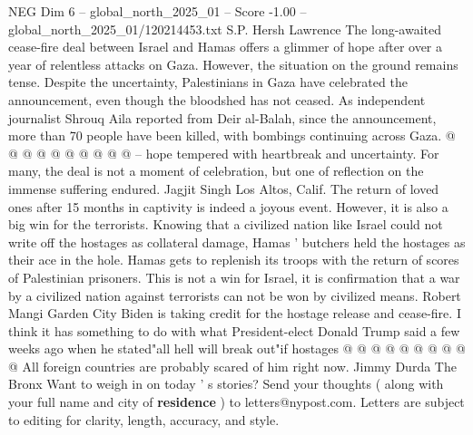 \begin{textsample}{NEG Dim 6 – global\_north\_2025\_01 – Score -1.00 – global\_north\_2025\_01/120214453.txt}
S.P.
Hersh Lawrence The long-awaited cease-fire deal between Israel and Hamas offers a glimmer of hope after over a year of relentless attacks on Gaza.
However, the situation on the ground remains tense.
Despite the uncertainty, Palestinians in Gaza have celebrated the announcement, even though the bloodshed has not ceased.
As independent journalist Shrouq Aila reported from Deir al-Balah, since the announcement, more than 70 people have been killed, with bombings continuing across Gaza. @ @ @ @ @ @ @ @ @ @ -- hope tempered with heartbreak and uncertainty.
For many, the deal is not a moment of celebration, but one of reflection on the immense suffering endured.
Jagjit Singh Los Altos, Calif.
The return of loved ones after 15 months in captivity is indeed a joyous event.
However, it is also a big win for the terrorists.
Knowing that a civilized nation like Israel could not write off the hostages as collateral damage, Hamas ' butchers held the hostages as their ace in the hole.
Hamas gets to replenish its troops with the return of scores of Palestinian prisoners.
This is not a win for Israel, it is confirmation that a war by a civilized nation against terrorists can not be won by civilized means.
Robert Mangi Garden City Biden is taking credit for the hostage release and cease-fire.
I think it has something to do with what President-elect Donald Trump said a few weeks ago when he stated"all hell will break out"if hostages @ @ @ @ @ @ @ @ @ @ All foreign countries are probably scared of him right now.
Jimmy Durda The Bronx Want to weigh in on today ' s stories?
Send your thoughts ( along with your full name and city of \textbf{residence} ) to letters@nypost.com.
Letters are subject to editing for clarity, length, accuracy, and style.

\end{textsample}
